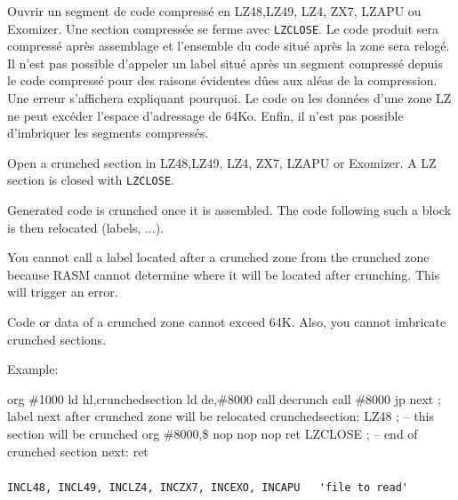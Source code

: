 \begin{xfr}
Ouvrir un segment de code compressé en LZ48,LZ49, LZ4, ZX7, LZAPU ou Exomizer. Une section compressée se ferme avec \texttt{LZCLOSE}.
Le code produit sera compressé après assemblage et l'ensemble du code situé après la zone sera relogé.
Il n'est pas possible d'appeler un label situé après un segment compressé depuis le code compressé pour des raisons évidentes dûes aux aléas de la compression. Une erreur s'affichera expliquant pourquoi.
Le code ou les données d'une zone LZ ne peut excéder l'espace d'adressage de 64Ko. Enfin, il n'est pas possible d'imbriquer les segments compressés.

\end{xfr}

\begin{xen}
Open a crunched section in LZ48,LZ49, LZ4, ZX7, LZAPU or Exomizer. A LZ section is closed with \texttt{LZCLOSE}.

Generated code is crunched once it is assembled. The code following such a block is then relocated (labels, ...).


You cannot call a label located after a crunched zone from the crunched zone because RASM cannot determine where it will be located after crunching. This will trigger an error.

Code or data of a crunched zone cannot exceed 64K.  Also, you cannot imbricate crunched sections.

Example:
\end{xen}


\begin{code}
  org \#1000
  ld hl,crunchedsection
  ld de,\#8000
  call decrunch
  call \#8000
  jp next         ; label next after crunched zone will be relocated
\medskip
  crunchedsection:
  LZ48            ; -- this section will be crunched
    org \#8000,\$
    nop
    nop
    nop
    ret
  LZCLOSE   ; -- end of crunched section
\medskip
  next:
    ret
\end{code}


\subsubsection{}

\begin{verbatim}
INCL48, INCL49, INCLZ4, INCZX7, INCEXO, INCAPU   'file to read'
\end{verbatim}

